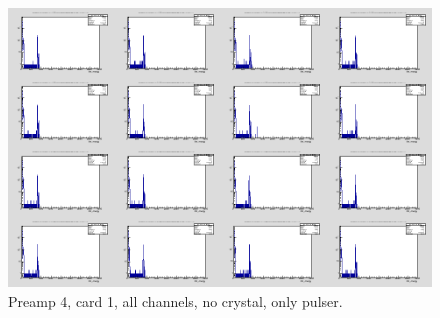 \documentclass{report}
\begin{document}
\begin{figure}[!htb]
  \includegraphics[width=\linewidth]{preamp4_lim_energy_card1_all.png}
  \caption{Preamp 4, card 1, all channels, no crystal, only pulser.}
\end{figure}
\end{document}
